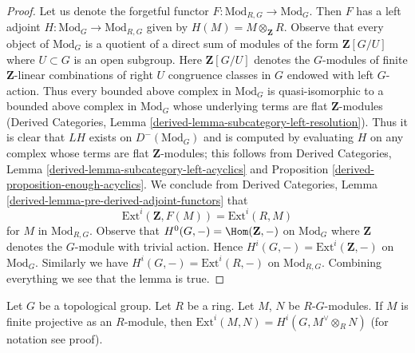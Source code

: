 \begin{proof}
Let us denote the forgetful functor $F : \text{Mod}_{R, G} \to \text{Mod}_G$.
Then $F$ has a left adjoint $H : \text{Mod}_G \to \text{Mod}_{R, G}$
given by $H(M) = M \otimes_\mathbf{Z} R$. Observe that every object of
$\text{Mod}_G$ is a quotient of a direct sum of modules of the form
$\mathbf{Z}[G/U]$ where $U \subset G$ is an open subgroup.
Here $\mathbf{Z}[G/U]$ denotes the $G$-modules of
finite $\mathbf{Z}$-linear combinations
of right $U$ congruence classes in $G$ endowed with left $G$-action.
Thus every bounded above complex in $\text{Mod}_G$ is quasi-isomorphic
to a bounded above complex in $\text{Mod}_G$ whose underlying
terms are flat $\mathbf{Z}$-modules
(Derived Categories, Lemma \ref{derived-lemma-subcategory-left-resolution}).
Thus it is clear that $LH$ exists on $D^-(\text{Mod}_G)$ and is computed by
evaluating $H$ on any complex whose terms are flat $\mathbf{Z}$-modules;
this follows from
Derived Categories, Lemma \ref{derived-lemma-subcategory-left-acyclics} and
Proposition \ref{derived-proposition-enough-acyclics}.
We conclude from Derived Categories, Lemma
\ref{derived-lemma-pre-derived-adjoint-functors}
that
$$
\text{Ext}^i(\mathbf{Z}, F(M)) = \text{Ext}^i(R, M)
$$
for $M$ in $\text{Mod}_{R, G}$.
Observe that $H^0(G, -) = \Hom(\mathbf{Z}, -)$ on
$\text{Mod}_G$ where $\mathbf{Z}$ denotes the $G$-module
with trivial action. Hence
$H^i(G, -) = \text{Ext}^i(\mathbf{Z}, -)$ on $\text{Mod}_G$.
Similarly we have $H^i(G, -) = \text{Ext}^i(R, -)$ on
$\text{Mod}_{R, G}$. Combining everything we see that the lemma is true.
\end{proof}

\begin{lemma}
\label{lemma-ext-modules-hom}
Let $G$ be a topological group. Let $R$ be a ring.
Let $M$, $N$ be $R\text{-}G$-modules. If $M$ is finite projective
as an $R$-module, then
$\text{Ext}^i(M, N) = H^i(G, M^\vee \otimes_R N)$ (for notation
see proof).
\end{lemma}

